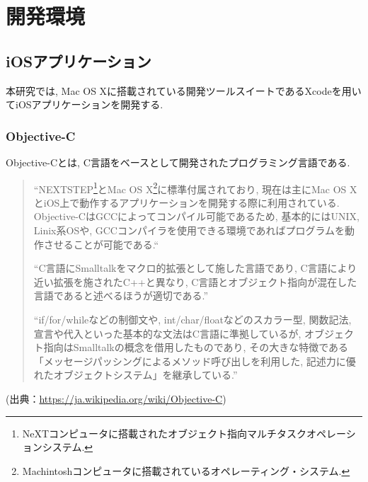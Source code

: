 \chapter{開発環境}
\label{chap:concept}

\section{iOSアプリケーション}
本研究では, Mac OS Xに搭載されている開発ツールスイートであるXcodeを用いてiOSアプリケーションを開発する.

\subsection{Objective-C}
Objective-Cとは, C言語をベースとして開発されたプログラミング言語である.

\begin{quotation}
\begin{screen}
“NEXTSTEP\footnote{NeXTコンピュータに搭載されたオブジェクト指向マルチタスクオペレーションシステム.}とMac OS X\footnote{Machintoshコンピュータに搭載されているオペレーティング・システム.}に標準付属されており, 現在は主にMac OS XとiOS上で動作するアプリケーションを開発する際に利用されている.
Objective-CはGCCによってコンパイル可能であるため, 基本的にはUNIX, Linix系OSや, GCCコンパイラを使用できる環境であればプログラムを動作させることが可能である.“

“C言語にSmalltalkをマクロ的拡張として施した言語であり, C言語により近い拡張を施されたC++と異なり, C言語とオブジェクト指向が混在した言語であると述べるほうが適切である.”

“if/for/whileなどの制御文や, int/char/floatなどのスカラー型, 関数記法, 宣言や代入といった基本的な文法はC言語に準拠しているが, オブジェクト指向はSmalltalkの概念を借用したものであり, その大きな特徴である「メッセージパッシングによるメソッド呼び出しを利用した, 記述力に優れたオブジェクトシステム」を継承している.”
\end{screen}
\end{quotation}
\begin{flushright}
(出典：\url{https://ja.wikipedia.org/wiki/Objective-C})
\end{flushright}

